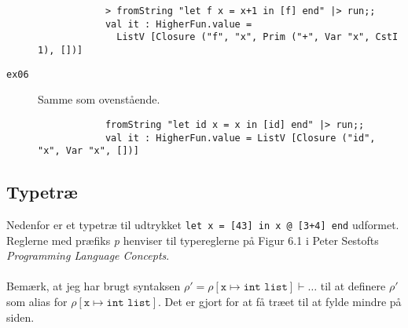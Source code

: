 \begin{description}
        \begin{verbatim}
            > fromString "let f x = x+1 in [f] end" |> run;;
            val it : HigherFun.value =
              ListV [Closure ("f", "x", Prim ("+", Var "x", CstI 1), [])]
        \end{verbatim}
    \item[\texttt{ex06}] Samme som ovenstående.
        \begin{verbatim}
            fromString "let id x = x in [id] end" |> run;;
            val it : HigherFun.value = ListV [Closure ("id", "x", Var "x", [])]
        \end{verbatim}
\end{description}

\subsection{Typetræ}

Nedenfor er et typetræ til udtrykket \texttt{let x = [43] in x @ [3+4] end} udformet. Reglerne med præfiks \textit{p} henviser til typereglerne på Figur 6.1 i Peter Sestofts \textit{Programming Language Concepts}.
\\\\
Bemærk, at jeg har brugt syntaksen $\rho' = \rho [\texttt{x} \mapsto \texttt{int list}] \vdash \ldots$ til at definere $\rho'$ som alias for $\rho [\texttt{x} \mapsto \texttt{int list}]$. Det er gjort for at få træet til at fylde mindre på siden.

\begin{figure}[H]
    \hbox{}
\end{figure}
